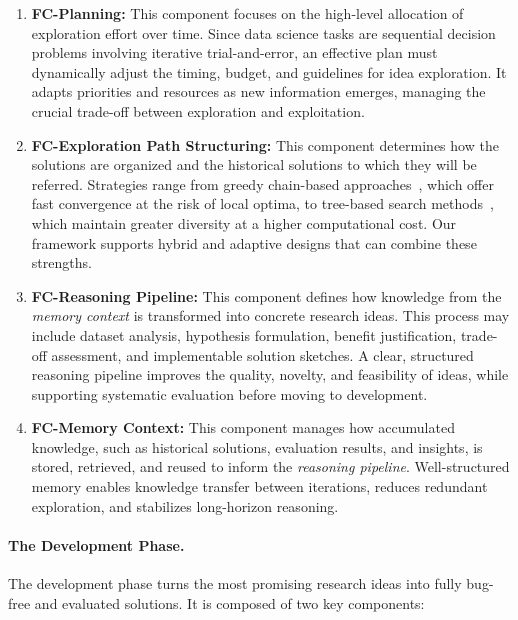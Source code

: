 \begin{enumerate}[leftmargin=4ex]
    \item[\ding{182}] \textbf{FC-Planning:} This component focuses on the high-level allocation of exploration effort over time. Since data science tasks are sequential decision problems involving iterative trial-and-error, an effective plan must dynamically adjust the timing, budget, and guidelines for idea exploration. It adapts priorities and resources as new information emerges, managing the crucial trade-off between exploration and exploitation.

    \item[\ding{183}] \textbf{FC-Exploration Path Structuring:} This component determines how the solutions are organized and the historical solutions to which they will be referred. Strategies range from greedy chain-based approaches~\citep{nam2025mle}, which offer fast convergence at the risk of local optima, to tree-based search methods~\citep{liu2025ml,kulibaba2025kompeteai}, which maintain greater diversity at a higher computational cost. Our framework supports hybrid and adaptive designs that can combine these strengths.

    \item[\ding{184}] \textbf{FC-Reasoning Pipeline:} This component defines how knowledge from the \textit{memory context} is transformed into concrete research ideas. This process may include dataset analysis, hypothesis formulation, benefit justification, trade-off assessment, and implementable solution sketches. A clear, structured reasoning pipeline improves the quality, novelty, and feasibility of ideas, while supporting systematic evaluation before moving to development.

    \item[\ding{185}] \textbf{FC-Memory Context:} This component manages how accumulated knowledge, such as historical solutions, evaluation results, and insights, is stored, retrieved, and reused to inform the \textit{reasoning pipeline}. Well-structured memory enables knowledge transfer between iterations, reduces redundant exploration, and stabilizes long-horizon reasoning.
\end{enumerate}

\paragraph{The Development Phase.} The development phase turns the most promising research ideas into fully bug-free and evaluated solutions. It is composed of two key components:

